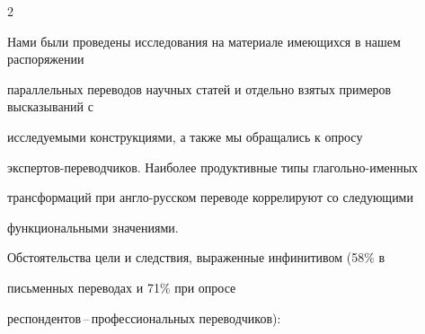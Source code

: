 \begin{multicols}{2}





Нами были проведены исследования на материале имеющихся в нашем распоряжении 


параллельных переводов научных статей и отдельно взятых примеров высказываний с 


исследуемыми конструкциями, а также мы обращались к опросу 


экспертов-переводчиков. Наиболее продуктивные типы глагольно-именных 


трансформаций при англо-русском переводе коррелируют со сле\-ду\-ющи\-ми 


функциональными значениями.





{\sf Обстоятельства цели и следствия, выраженные инфинитивом (58\% в


письменных переводах и 71\% при опросе


респондентов\,--\,профессиональных переводчиков):}








\end{multicols}
